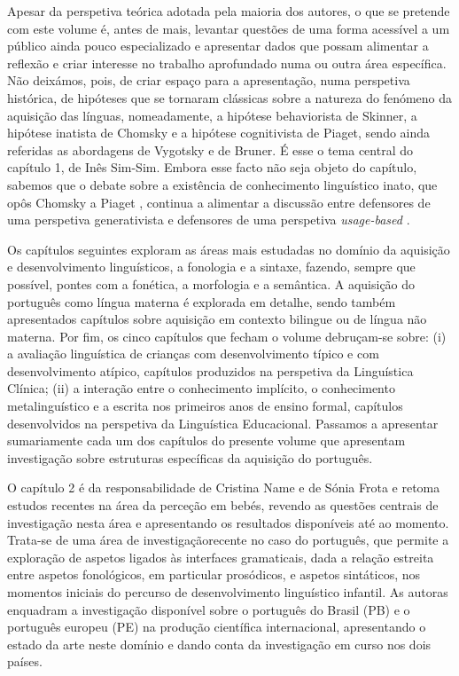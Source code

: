 Apesar da perspetiva teórica adotada pela maioria dos autores, o que se pretende com este volume é, antes de mais, levantar questões de uma forma acessível a um público ainda pouco especializado e apresentar dados que possam alimentar a reflexão e criar interesse no trabalho aprofundado numa ou outra área específica. Não deixámos, pois, de criar espaço para a apresentação, numa perspetiva histórica, de hipóteses que se tornaram clássicas sobre a natureza do fenómeno da aquisição das línguas, nomeadamente, a hipótese behaviorista de Skinner, a hipótese inatista de Chomsky e a hipótese cognitivista de Piaget, sendo ainda referidas as abordagens de Vygotsky e de Bruner. É esse o tema central do capítulo 1, de Inês Sim-Sim. Embora esse facto não seja objeto do capítulo, sabemos que o debate sobre a existência de conhecimento linguístico inato, que opôs Chomsky a Piaget \citep{piattelli-palmarini1980}, continua a alimentar a discussão entre defensores de uma perspetiva generativista e defensores de uma perspetiva \textit{usage-based} \citep{tomasello2003}.

Os capítulos seguintes exploram as áreas mais estudadas no domínio da aquisição e desenvolvimento linguísticos, a fonologia e a sintaxe, fazendo, sempre que possível, pontes com a fonética, a morfologia e a semântica. A aquisição do português como língua materna é explorada em detalhe, sendo também apresentados capítulos sobre aquisição em contexto bilingue ou de língua não materna. Por fim, os cinco capítulos que fecham o volume debruçam-se sobre: (i) a avaliação linguística de crianças com desenvolvimento típico e com desenvolvimento atípico, capítulos produzidos na perspetiva da Linguística Clínica; (ii) a interação entre o conhecimento implícito, o conhecimento metalinguístico e a escrita nos primeiros anos de ensino formal, capítulos desenvolvidos na perspetiva da Linguística Educacional. Passamos a apresentar sumariamente cada um dos capítulos do presente volume que apresentam investigação sobre estruturas específicas da aquisição do português.

O capítulo 2 é da responsabilidade de Cristina Name e de Sónia Frota e retoma estudos recentes na área da perceção em bebés, revendo as questões centrais de investigação nesta área e apresentando os resultados disponíveis até ao momento. Trata-se de uma área de investigação\largerpage recente no caso do português, que permite a exploração de aspetos ligados às interfaces gramaticais, dada a relação estreita entre aspetos fonológicos, em particular prosódicos, e aspetos sintáticos, nos momentos iniciais do percurso de desenvolvimento linguístico infantil. As autoras enquadram a investigação disponível sobre o português do Brasil (PB) e o português europeu (PE) na produção científica internacional, apresentando o estado da arte neste domínio e dando conta da investigação em curso nos dois países.

